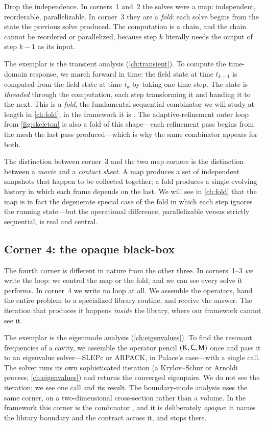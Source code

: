 Drop the independence. In corners~1 and~2 the solves were a map: independent,
reorderable, parallelizable. In corner~3 they are a \emph{fold}: each solve
begins from the state the previous solve produced. The computation is a chain,
and the chain cannot be reordered or parallelized, because step $k$ literally
needs the output of step $k-1$ as its input.

The exemplar is the transient analysis (\cref{ch:transient}). To compute the
time-domain response, we march forward in time: the field state at time
$t_{k+1}$ is computed from the field state at time $t_k$ by taking one time
step. The state is \emph{threaded} through the computation, each step
transforming it and handing it to the next. This is a \emph{fold}, the
fundamental sequential combinator we will study at length in \cref{ch:fold}; in
the framework it is . The adaptive-refinement outer loop from
\cref{fig:skeleton} is also a fold of this shape---each refinement pass begins
from the mesh the last pass produced---which is why the same combinator appears
for both.

The distinction between corner~3 and the two map corners is the distinction
between a \emph{movie} and a \emph{contact sheet}. A map produces a set of
independent snapshots that happen to be collected together; a fold produces a
single evolving history in which each frame depends on the last. We will see in
\cref{ch:fold} that the map is in fact the degenerate special case of the fold
in which each step ignores the running state---but the operational difference,
parallelizable versus strictly sequential, is real and central.

\subsection{Corner 4: the opaque black-box}

The fourth corner is different in nature from the other three. In corners~1--3
\emph{we} write the loop: we control the map or the fold, and we can see every
solve it performs. In corner~4 we write no loop at all. We assemble the
operators, hand the entire problem to a specialized library routine, and receive
the answer. The iteration that produces it happens \emph{inside} the library,
where our framework cannot see it.

The exemplar is the eigenmode analysis (\cref{ch:eigenvalues}). To find the
resonant frequencies of a cavity, we assemble the operator pencil
$(\mathsf{K},\mathsf{C},\mathsf{M})$ once and pass it to an eigenvalue solver---SLEPc or ARPACK,
in Palace's case---with a single call. The solver runs its own sophisticated
iteration (a Krylov--Schur or Arnoldi process; \cref{ch:eigenvalues}) and
returns the converged eigenpairs. We do not see the iteration; we see one call
and its result. The boundary-mode analysis uses the same corner, on a
two-dimensional cross-section rather than a volume. In the framework this corner
is the combinator , and it is deliberately \emph{opaque}: it
names the library boundary and the contract across it, and stops there.

